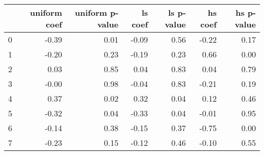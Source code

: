 \begin{tabular}{lrrrrrr}
\toprule
 & uniform coef & uniform p-value & ls coef & ls p-value & hs coef & hs p-value \\
\midrule
0 & -0.39 & 0.01 & -0.09 & 0.56 & -0.22 & 0.17 \\
1 & -0.20 & 0.23 & -0.19 & 0.23 & 0.66 & 0.00 \\
2 & 0.03 & 0.85 & 0.04 & 0.83 & 0.04 & 0.79 \\
3 & -0.00 & 0.98 & -0.04 & 0.83 & -0.21 & 0.19 \\
4 & 0.37 & 0.02 & 0.32 & 0.04 & 0.12 & 0.46 \\
5 & -0.32 & 0.04 & -0.33 & 0.04 & -0.01 & 0.95 \\
6 & -0.14 & 0.38 & -0.15 & 0.37 & -0.75 & 0.00 \\
7 & -0.23 & 0.15 & -0.12 & 0.46 & -0.10 & 0.55 \\
\bottomrule
\end{tabular}
